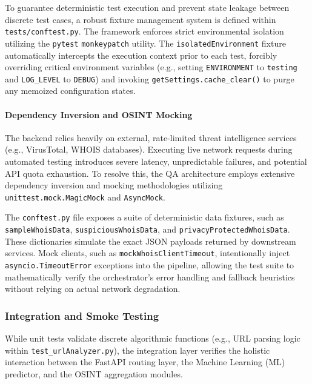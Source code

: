 To guarantee deterministic test execution and prevent state leakage
between discrete test cases, a robust fixture management system is
defined within \texttt{tests/conftest.py}. The framework enforces strict
environmental isolation utilizing the \texttt{pytest}
\texttt{monkeypatch} utility. The \texttt{isolatedEnvironment} fixture
automatically intercepts the execution context prior to each test,
forcibly overriding critical environment variables (e.g., setting
\texttt{ENVIRONMENT} to \texttt{testing} and \texttt{LOG\_LEVEL} to
\texttt{DEBUG}) and invoking \texttt{getSettings.cache\_clear()} to
purge any memoized configuration states.

\paragraph{Dependency Inversion and OSINT
Mocking}\label{dependency-inversion-and-osint-mocking}

The backend relies heavily on external, rate-limited threat intelligence
services (e.g., VirusTotal, WHOIS databases). Executing live network
requests during automated testing introduces severe latency,
unpredictable failures, and potential API quota exhaustion. To resolve
this, the QA architecture employs extensive dependency inversion and
mocking methodologies utilizing \texttt{unittest.mock.MagicMock} and
\texttt{AsyncMock}.

The \texttt{conftest.py} file exposes a suite of deterministic data
fixtures, such as \texttt{sampleWhoisData},
\texttt{suspiciousWhoisData}, and \texttt{privacyProtectedWhoisData}.
These dictionaries simulate the exact JSON payloads returned by
downstream services. Mock clients, such as
\texttt{mockWhoisClientTimeout}, intentionally inject
\texttt{asyncio.TimeoutError} exceptions into the pipeline, allowing the
test suite to mathematically verify the orchestrator's error handling
and fallback heuristics without relying on actual network degradation.

\subsubsection{Integration and Smoke
Testing}\label{integration-and-smoke-testing}

While unit tests validate discrete algorithmic functions (e.g., URL
parsing logic within \texttt{test\_urlAnalyzer.py}), the integration
layer verifies the holistic interaction between the FastAPI routing
layer, the Machine Learning (ML) predictor, and the OSINT aggregation
modules.

